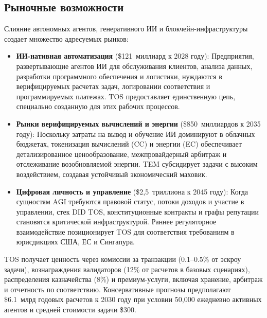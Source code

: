 \documentclass[11pt]{article}
\begin{document}
\subsection{Рыночные возможности}
Слияние автономных агентов, генеративного ИИ и блокчейн-инфраструктуры создает множество адресуемых рынков:
\begin{itemize}[noitemsep]
  \item \textbf{ИИ-нативная автоматизация} (\$121~миллиард к 2028 году): Предприятия, развертывающие агентов ИИ для обслуживания клиентов, анализа данных, разработки программного обеспечения и логистики, нуждаются в верифицируемых расчетах задач, логировании соответствия и программируемых платежах. TOS предоставляет единственную цепь, специально созданную для этих рабочих процессов.
  \item \textbf{Рынки верифицируемых вычислений и энергии} (\$850~миллиардов к 2035 году): Поскольку затраты на вывод и обучение ИИ доминируют в облачных бюджетах, токенизация вычислений (CC) и энергии (EC) обеспечивает детализированное ценообразование, межпровайдерный арбитраж и отслеживание возобновляемой энергии. TEM субсидирует задачи с высоким воздействием, создавая устойчивый экономический маховик.
  \item \textbf{Цифровая личность и управление} (\$2,5~триллиона к 2045 году): Когда сущностям AGI требуются правовой статус, потоки доходов и участие в управлении, стек DID TOS, конституционные контракты и графы репутации становятся критической инфраструктурой. Раннее регуляторное взаимодействие позиционирует TOS для соответствия требованиям в юрисдикциях США, ЕС и Сингапура.
\end{itemize}

TOS получает ценность через комиссии за транзакции (0.1--0.5\% от эскроу задачи), вознаграждения валидаторов (12\% от расчетов в базовых сценариях), распределения казначейства (8\%) и премиум-услуги, включая хранение, арбитраж и отчетность по соответствию. Консервативные прогнозы предполагают \$6.1~млрд годовых расчетов к 2030 году при условии 50,000 ежедневно активных агентов и средней стоимости задачи \$300.
\end{document}
